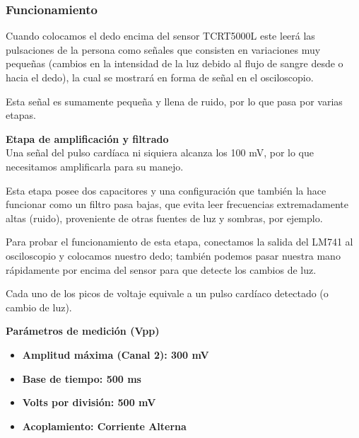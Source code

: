 \documentclass[12pt]{article}
\begin{document}
            \subsubsection{Funcionamiento}
            Cuando colocamos el dedo encima del sensor TCRT5000L este leerá las pulsaciones de la persona como señales que consisten en variaciones muy pequeñas (cambios en la intensidad de la luz debido al flujo de sangre desde o hacia el dedo), la cual se mostrará en forma de señal en el osciloscopio. 
            
            Esta señal es sumamente pequeña y llena de ruido, por lo que pasa por varias etapas.
            
            \textbf{Etapa de amplificación y filtrado}     \\
            Una señal del pulso cardíaca ni siquiera alcanza los 100 mV, por lo que necesitamos amplificarla para su manejo. 
            
            Esta etapa posee dos capacitores y una configuración que también la hace funcionar como un filtro pasa bajas, que evita leer frecuencias extremadamente altas (ruido), proveniente de otras fuentes de luz y sombras, por ejemplo.
            
            Para probar el funcionamiento de esta etapa, conectamos la salida del LM741 al osciloscopio y colocamos nuestro dedo; también podemos pasar nuestra mano rápidamente por encima del sensor para que detecte los cambios de luz.
            
            Cada uno de los picos de voltaje equivale a un pulso cardíaco detectado (o cambio de luz).
            
             \textbf{Parámetros de medición (Vpp)}
            \begin{multicols}{2}
                \begin{itemize}
                    \item[\checkmark] \textbf{Amplitud máxima (Canal 2): 300 mV}
                    \item[\checkmark] \textbf{Base de tiempo: 500 ms}
            \columnbreak
                    \item[\checkmark] \textbf{Volts por división: 500 mV}
                    \item[\checkmark] \textbf{Acoplamiento: Corriente Alterna}
                \end{itemize}
            \end{multicols}
            
\end{document}
